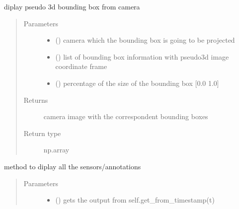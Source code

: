 \documentclass[letterpaper,10pt,english]{sphinxmanual}
\begin{document}
\begin{fulllineitems}
\begin{fulllineitems}
\label{\detokenize{radiate:radiate.Sequence.vis_3d_bbox_cam}}
diplay pseudo 3d bounding box from camera
\begin{quote}\begin{description}
\item[{Parameters}] \leavevmode\begin{itemize}
\item {} 
 () \textendash{} camera which the bounding box is going to be projected

\item {} 
 () \textendash{} list of bounding box information with pseudo\sphinxhyphen{}3d image coordinate frame

\item {} 
 () \textendash{} percentage of the size of the bounding box {[}0.0 1.0{]}

\end{itemize}

\item[{Returns}] \leavevmode
camera image with the correspondent bounding boxes

\item[{Return type}] \leavevmode
np.array

\end{description}\end{quote}

\end{fulllineitems}


\begin{fulllineitems}
\label{\detokenize{radiate:radiate.Sequence.vis_all}}
method to diplay all the sensors/annotations
\begin{quote}\begin{description}
\item[{Parameters}] \leavevmode\begin{itemize}
\item {} 
 () \textendash{} gets the output from self.get\_from\_timestamp(t)


\end{itemize}
\end{description}
\end{quote}
\end{fulllineitems}
\end{fulllineitems}
\end{document}
